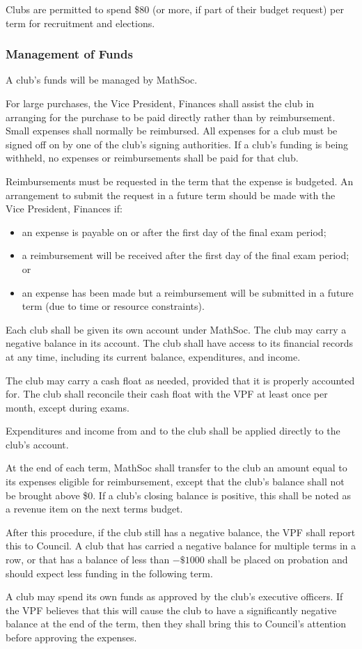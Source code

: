 Clubs are permitted to spend \$80 (or more, if part of their budget request) per
term for recruitment and elections.

\subsubsection{Management of Funds}
A club's funds will be managed by MathSoc.

For large purchases, the Vice President, Finances shall assist the club in
arranging for the purchase to be paid directly rather than by reimbursement.
Small expenses shall normally be reimbursed. All expenses for a club must be
signed off on by one of the club's signing authorities. If a club's funding is
being withheld, no expenses or reimbursements shall be paid for that club.

Reimbursements must be requested in the term that the expense is budgeted. 
An arrangement to submit the request in a future term should be made with
the Vice President, Finances if:
\begin{itemize}
	\item an expense is payable on or after the first day of the final exam period;
	\item a reimbursement will be received after the first day of the final exam period; or
	\item an expense has been made but a reimbursement will be submitted in a 
	future term (due to time or resource constraints).
\end{itemize}

Each club shall be given its own account under MathSoc.
The club may carry a negative balance in its account.
The club shall have access to its financial records at any time, including its
current balance, expenditures, and income.

The club may carry a cash float as needed, provided that it is properly
accounted for. The club shall reconcile their cash float with the VPF at least
once per month, except during exams.

Expenditures and income from and to the club shall be applied directly to the
club's account.

At the end of each term, MathSoc shall transfer to the club an amount equal to
its expenses eligible for reimbursement, except that the club's balance shall
not be brought above \$0. If a club's closing balance is positive, this shall
be noted as a revenue item on the next terms budget.

After this procedure, if the club still has a negative balance, the VPF shall
report this to Council. A club that has carried a negative balance for multiple
terms in a row, or that has a balance of less than $-\$1000$ shall be placed on
probation and should expect less funding in the following term.

A club may spend its own funds as approved by the club's executive officers. If
the VPF believes that this will cause the club to have a significantly negative
balance at the end of the term, then they shall bring this to Council's
attention before approving the expenses.
